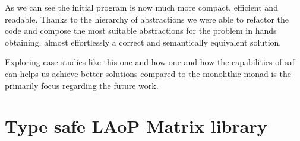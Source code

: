 \documentclass[
  oneside,
  11pt, a4paper,
  footinclude=true,
  headinclude=true,
  cleardoublepage=empty
]{scrbook}
\theoremstyle{definition}
\theoremstyle{definition}
\begin{document}
    As we can see the initial program is now much more compact, efficient and readable. Thanks to the hierarchy of abstractions we were able to refactor the code and compose the most suitable abstractions for the problem in hands obtaining, almost effortlessly a correct and semantically equivalent solution.
    
    Exploring case studies like this one and how one and how the capabilities of \gls{saf} can helps us achieve better solutions compared to the monolithic monad is the primarily focus regarding the future work.
    

	

	
	
	
	\chapter{Type safe LAoP Matrix library}\label{appendix-a}
	
\end{document}
